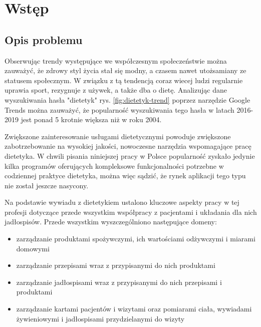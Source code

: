 \chapter*{Wstęp}\label{ch:admission}

\section*{Opis problemu}\label{sec:problem-description}

Obserwując trendy występujące we współczesnym społeczeństwie można zauważyć, że zdrowy styl życia stał się modny, a czasem nawet utożsamiany ze statusem społecznym.
W związku z tą tendencją coraz wiecej ludzi regularnie uprawia sport, rezygnuje z używek, a także dba o dietę.
Analizując dane wyszukiwania hasła "dietetyk" rys. \ref{fig:dietetyk-trend} poprzez narzędzie Google Trends\cite{url:google-trends} można zauważyć, że popularność wyszukiwania tego hasła w latach 2016-2019 jest ponad 5 krotnie większa niż w roku 2004.


Zwiększone zainteresowanie usługami dietetycznymi powoduje zwiększone zabotrzebowanie na wysokiej jakości, nowoczesne narzędzia wspomagające pracę dietetyka.
W chwili pisania niniejszej pracy w Polsce popularność zyskało jedynie kilka programów oferujących kompleksowe funkcjonalności potrzebne w codziennej praktyce dietetyka, można więc sądzić, że rynek aplikacji tego typu nie został jeszcze nasycony.

\par
Na podstawie wywiadu z dietetykiem ustalono kluczowe aspekty pracy w tej profesji dotyczące przede wszystkim współpracy z pacjentami i układania dla nich jadłospisów.
Przede wszystkim wyszczególniono następujące domeny:
\begin{itemize}
    \item zarządzanie produktami spożywczymi, ich wartościami odżywczymi i miarami domowymi
    \item zarządzanie przepisami wraz z przypisanymi do nich produktami
    \item zarządzanie jadłospisami wraz z przypisanymi do nich przepisami i produktami
    \item zarządzanie kartami pacjentów i wizytami oraz pomiarami ciała, wywiadami żywieniowymi i jadłospisami przydzielanymi do wizyty
\end{itemize}

